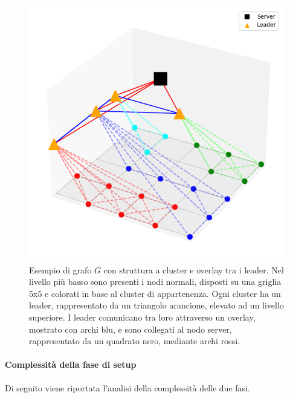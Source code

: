 \documentclass[12pt, a4paper]{report}
\begin{document}
\begin{figure}
    \centering
    \includegraphics[width=0.5\linewidth]{images/setup/Esempio_Grafo_G.png}
    \caption{Esempio di grafo $G$ con struttura a cluster e overlay tra i leader. Nel livello pi\`u basso sono presenti i nodi normali, disposti su una griglia 5x5 e colorati in base al cluster di appartenenza. Ogni cluster ha un leader, rappresentato da un triangolo arancione, elevato ad un livello superiore. I leader comunicano tra loro attraverso un overlay, mostrato con archi blu, e sono collegati al nodo server, rappresentato da un quadrato nero, mediante archi rossi.}
    \label{fig:enter-label}
\end{figure}

\paragraph{Complessit\`a della fase di setup}\label{par:complessita_setup}

Di seguito viene riportata l'analisi della complessit\`a delle due fasi.
\end{document}
